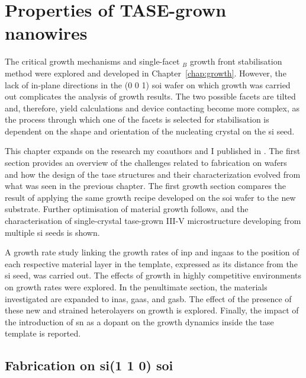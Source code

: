 \chapter{Properties of TASE-grown nanowires}
\label{chap: properties}

The critical growth mechanisms and single-facet \(_B\) growth front stabilisation method were explored and developed in Chapter~\ref{chap:growth}. However, the lack of in-plane  directions in the \hkl(0 0 1) \acf{soi} wafer on which growth was carried out complicates the analysis of growth results. The two possible  facets are tilted and, therefore, yield calculations and device contacting become more complex, as the process through which one of the facets is selected for stabilisation is dependent on the shape and orientation of the nucleating crystal on the \acs{si} seed.

This chapter expands on the research my coauthors and I published in \cite{Brugnolotto2023, Brugnolotto2023_2}. The first section provides an overview of the challenges related to fabrication on  wafers and how the design of the \acf{tase} structures and their characterization evolved from what was seen in the previous chapter. The first growth section compares the result of applying the same growth recipe developed on the  \acs{soi} wafer to the new substrate. Further optimisation of material growth follows, and the characterisation of single-crystal \acs{tase}-grown III-V microstructure developing from multiple \acl{si} seeds is shown.

A growth rate study linking the growth rates of \acf{inp} and \acf{ingaas} to the position of each respective material layer in the template, expressed as its distance from the \acl{si} seed, was carried out. The effects of growth in highly competitive environments on growth rates were explored. In the penultimate section, the materials investigated are expanded to \acf{inas}, \acf{gaas}, and \acf{gasb}. The effect of the presence of these new and strained heterolayers on growth is explored. Finally, the impact of the introduction of \acf{sn} as a dopant on the growth dynamics inside the \acs{tase} template is reported.

\section{\texorpdfstring{Fabrication on \acs{si}\hkl(1 1 0) \acs{soi}}{Fabrication on Si(110) SOI}}

